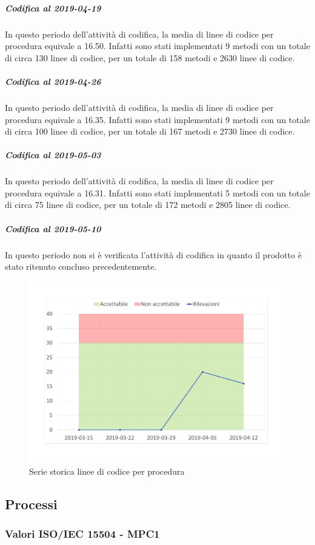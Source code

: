 \subparagraph{Codifica al 2019-04-19}
In questo periodo dell'attività di codifica, la media di linee di codice per procedura equivale a 16.50. Infatti sono stati implementati 9 metodi con un totale di circa 130 linee di codice, per un totale di 158 metodi e 2630 linee di codice.

\subparagraph{Codifica al 2019-04-26}
In questo periodo dell'attività di codifica, la media di linee di codice per procedura equivale a 16.35. Infatti sono stati implementati 9 metodi con un totale di circa 100 linee di codice, per un totale di 167 metodi e 2730 linee di codice.

\subparagraph{Codifica al 2019-05-03}
In questo periodo dell'attività di codifica, la media di linee di codice per procedura equivale a 16.31. Infatti sono stati implementati 5 metodi con un totale di circa 75 linee di codice, per un totale di 172 metodi e 2805 linee di codice.

\subparagraph{Codifica al 2019-05-10}
In questo periodo non si è verificata l'attività di codifica in quanto il prodotto è stato ritenuto concluso precedentemente.

\begin{figure}[H]
	\centering
	\includegraphics[scale=0.6]{images/resoconto/MPS10Chart.pdf}
	\caption{Serie storica linee di codice per procedura}	
\end{figure}

\subsection{Processi}
\subsubsection{Valori ISO/IEC 15504 - MPC1}

